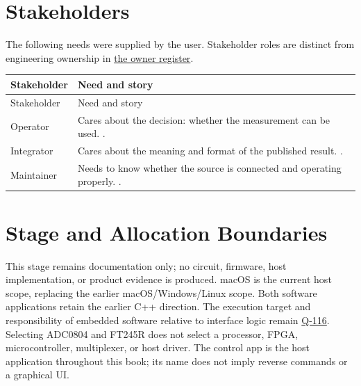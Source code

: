 \section{Stakeholders}
\label{Section:MeasurementStakeholders}
The following needs were supplied by the user. Stakeholder roles are distinct from engineering ownership in \hyperref[Table:ProjectOwners]{the owner register}.

\small
\begin{tabularx}{\linewidth}{L{2.5cm}Y}
\caption{Measurement Stakeholder Needs\label{Table:StakeholderNeeds}}\\
\toprule
Stakeholder & Need and story\\\midrule
\endfirsthead
\toprule
Stakeholder & Need and story\\\midrule
\endhead
\bottomrule
\endlastfoot
{}\label{Stakeholder:Operator}Operator & Cares about the decision: whether the measurement can be used. .\\
\label{Stakeholder:Integrator}Integrator & Cares about the meaning and format of the published result. .\\
\label{Stakeholder:Maintainer}Maintainer & Needs to know whether the source is connected and operating properly. .\\
\end{tabularx}
\normalsize

\section{Stage and Allocation Boundaries}
This stage remains documentation only; no circuit, firmware, host implementation, or product evidence is produced. macOS is the current host scope, replacing the earlier macOS/Windows/Linux scope. Both software applications retain the earlier C++ direction. The execution target and responsibility of embedded software relative to interface logic remain \hyperref[Question:Q-116]{Q-116}. Selecting ADC0804 and FT245R does not select a processor, FPGA, microcontroller, multiplexer, or host driver. The control app is the host application throughout this book; its name does not imply reverse commands or a graphical UI.
